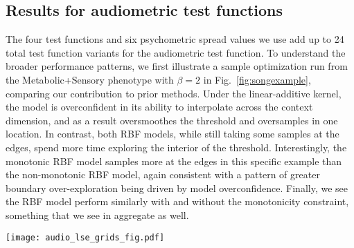 \documentclass[../main.tex]{subfiles}
\begin{document}
\subsection{Results for audiometric test functions}

The four test functions and six psychometric spread values we use add up to 24 total test function variants for the audiometric test function. To understand the broader performance patterns, we first illustrate a sample optimization run from the Metabolic+Sensory phenotype with $\beta=2$ in Fig.~\ref{fig:songexample}, comparing our contribution to prior methods. Under the linear-additive kernel, the model is overconfident in its ability to interpolate across the context dimension, and as a result oversmoothes the threshold and oversamples in one location. In contrast, both RBF models, while still taking some samples at the edges, spend more time exploring the interior of the threshold. Interestingly, the monotonic RBF model samples more at the edges in this specific example than the non-monotonic RBF model, again consistent with a pattern of greater boundary over-exploration being driven by model overconfidence. Finally, we see the RBF model perform similarly with and without the monotonicity constraint, something that we see in aggregate as well.

\begin{figure*}[!htb]
    \centering
    \texttt{[image: audio\_lse\_grids\_fig.pdf]}
    \caption{\textbf{Example of samples taken by three representative models on the Metabolic+Sensory test function after 50 trials with $\beta$=2}. All models begin with the same 5 trials generated from a Sobol sequence and then proceed according to their acquisition function (BALD in the case of the linear-additive model; LSE otherwise). Substantial boundary over-exploration is apparent in the linear-additive model, even with the addition of the previously-reported exploration heuristic. Both RBF models with the LSE objective sample consistently at putative threshold locations and produce good mean threshold estimates after only 50 trials.}
    \label{fig:songexample}
\end{figure*}
\end{document}
